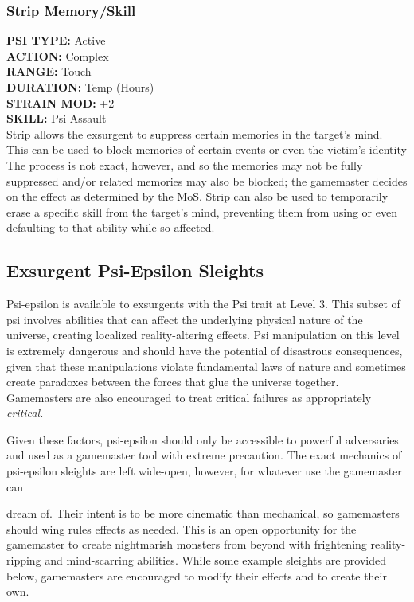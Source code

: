 \subsubsection{Strip Memory/Skill } \textbf{PSI TYPE:} Active \\ \textbf{ACTION:} Complex \\ \textbf{RANGE:} Touch \\ \textbf{DURATION:} Temp (Hours) \\ \textbf{STRAIN MOD:} +2 \\ \textbf{SKILL:} Psi Assault \\ Strip allows the exsurgent to suppress certain memories in the target's mind. This can be used to block memories of certain events or even the victim's identity The process is not exact, however, and so the memories may not be fully suppressed and/or related memories may also be blocked; the gamemaster decides on the effect as determined by the MoS. Strip can also be used to temporarily erase a specific skill from the target's mind, preventing them from using or even defaulting to that ability while so affected. 





\subsection{Exsurgent Psi-Epsilon Sleights } 

Psi-epsilon is available to exsurgents with the Psi trait at Level 3. This subset of psi involves abilities that can affect the underlying physical nature of the universe, creating localized reality-altering effects. Psi manipulation on this level is extremely dangerous and should have the potential of disastrous consequences, given that these manipulations violate fundamental laws of nature and sometimes create paradoxes between the forces that glue the universe together. Gamemasters are also encouraged to treat critical failures as appropriately \textit{critical.} 

Given these factors, psi-epsilon should only be accessible to powerful adversaries and used as a gamemaster tool with extreme precaution. The exact mechanics of psi-epsilon sleights are left wide-open, however, for whatever use the gamemaster can 

dream of. Their intent is to be more cinematic than mechanical, so gamemasters should wing rules effects as needed. This is an open opportunity for the gamemaster to create nightmarish monsters from beyond with frightening reality-ripping and mind-scarring abilities. While some example sleights are provided below, gamemasters are encouraged to modify their effects and to create their own. 


